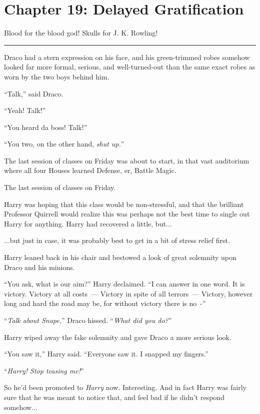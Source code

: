 \chapter{Chapter 19: Delayed Gratification}
Blood for the blood god! Skulls for J. K. Rowling!

\begin{center}\rule{3in}{0.4pt}\end{center}

Draco had a stern expression on his face, and his green-trimmed robes somehow looked far more formal, serious, and well-turned-out than the same exact robes as worn by the two boys behind him.

``Talk,'' said Draco.

``Yeah! Talk!''

``You heard da boss! Talk!''

``You two, on the other hand, \emph{shut up.}''

The last session of classes on Friday was about to start, in that vast auditorium where all four Houses learned Defense, er, Battle Magic.

The last session of classes on Friday.

Harry was hoping that this class would be non-stressful, and that the brilliant Professor Quirrell would realize this was perhaps not the best time to single out Harry for anything. Harry had recovered a little, but...

...but just in case, it was probably best to get in a bit of stress relief first.

Harry leaned back in his chair and bestowed a look of great solemnity upon Draco and his minions.

``You ask, what is our aim?'' Harry declaimed. ``I can answer in one word. It is victory. Victory at all costs~--- Victory in spite of all terrors~--- Victory, however long and hard the road may be, for without victory there is no~-''

``\emph{Talk about Snape,}'' Draco hissed. ``\emph{What did you do?}''

Harry wiped away the fake solemnity and gave Draco a more serious look.

``You saw it,'' Harry said. ``Everyone saw it. I snapped my fingers.''

``\emph{Harry! Stop teasing me!}''

So he'd been promoted to \emph{Harry} now. Interesting. And in fact Harry was fairly sure that he was meant to notice that, and feel bad if he didn't respond somehow...

